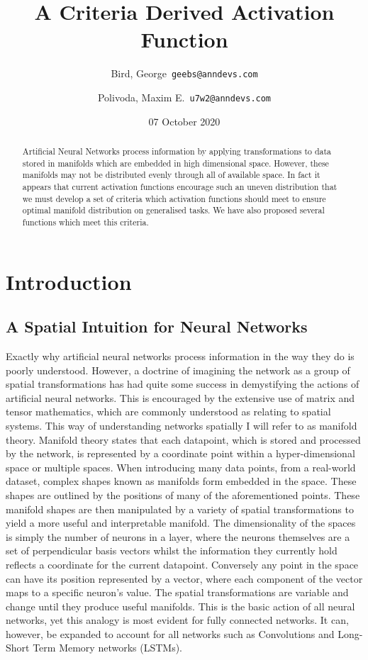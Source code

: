 \documentclass[onecolumn]{article}
\begin{document}
\title{A Criteria Derived Activation Function}

\author{
   Bird, George\
  \texttt{geebs@anndevs.com}
  \and
  Polivoda, Maxim E.\
  \texttt{u7w2@anndevs.com}
}
\date{07 October 2020}


\maketitle

\begin{abstract}
    Artificial Neural Networks process information by applying transformations to data stored in manifolds which are embedded in high dimensional space. However, these manifolds may not be distributed evenly through all of available space. In fact it appears that current activation functions encourage such an uneven distribution that we must develop a set of criteria which activation functions should meet to ensure optimal manifold distribution on generalised tasks. We have also proposed several functions which meet this criteria.
\end{abstract}

\section{Introduction}
    \subsection{A Spatial Intuition for Neural Networks}
        
    Exactly why artificial neural networks process information in the way they do is poorly understood. However, a doctrine of imagining the network as a group of spatial transformations has had quite some success in demystifying the actions of artificial neural networks. This is encouraged by the extensive use of matrix and tensor mathematics, which are commonly understood as relating to spatial systems. This way of understanding networks spatially I will refer to as manifold theory. Manifold theory states that each datapoint, which is stored and processed by the network, is represented by a coordinate point within a hyper-dimensional space or multiple spaces. When introducing many data points, from a real-world dataset, complex shapes known as manifolds form embedded in the space. These shapes are outlined by the positions of many of the aforementioned points. These manifold shapes are then manipulated by a variety of spatial transformations to yield a more useful and interpretable manifold. The dimensionality of the spaces is simply the number of neurons in a layer, where the neurons themselves are a set of perpendicular basis vectors whilst the information they currently hold reflects a coordinate for the current datapoint. Conversely any point in the space can have its position represented by a vector, where each component of the vector maps to a specific neuron's value. The spatial transformations are variable and change until they produce useful manifolds. This is the basic action of all neural networks, yet this analogy is most evident for fully connected networks. It can, however, be expanded to account for all networks such as Convolutions and Long-Short Term Memory networks (LSTMs).
\end{document}
